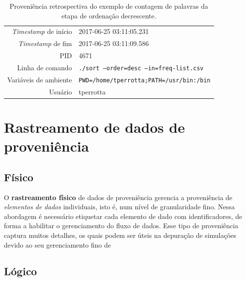 \begin{table}[ht]
    \centering
    \begin{tabular}{r|l}
        \hline
        \textit{Timestamp} de início & 2017-06-25 03:11:05.231                         \\
        \textit{Timestamp} de fim    & 2017-06-25 03:11:09.586                         \\
        PID                          & 4671                                            \\
        Linha de comando             & \texttt{./sort --order=desc --in=freq-list.csv} \\
        Variáveis de ambiente        & \texttt{PWD=/home/tperrotta;PATH=/usr/bin:/bin} \\
        Usuário                      & tperrotta                                       \\
        \hline
    \end{tabular}
    \caption[Proveniência retrospectiva do exemplo de contagem de palavras]{Proveniência retrospectiva do exemplo de contagem de palavras da etapa de ordenação decrescente.}%
    \label{tab:word-count-retrospective}
\end{table}

\section{Rastreamento de dados de proveniência}

\subsection{Físico}

O \textbf{rastreamento físico} de dados de proveniência gerencia a proveniência de \emph{elementos de dados} individuais, isto é, num nível de granularidade fino. Nessa abordagem é necessário etiquetar cada elemento de dado com identificadores, de forma a habilitar o gerenciamento do fluxo de dados. Esse tipo de proveniência captura muitos detalhes, os quais podem ser úteis na depuração de simulações devido ao seu gerenciamento fino de 

\subsection{Lógico}


